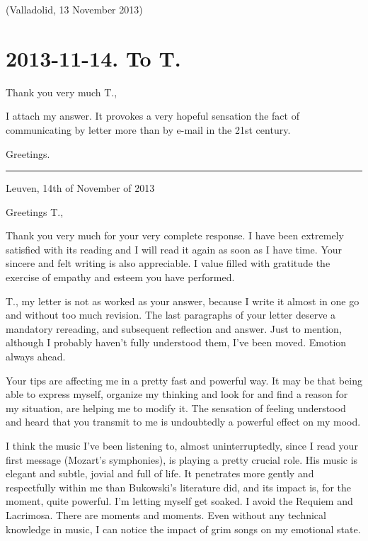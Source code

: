 \documentclass[]{book}
\begin{document}
(Valladolid, 13 November 2013)

\hypertarget{totomas20131114}{%
\section*{2013-11-14. To T.}\label{totomas20131114}}

Thank you very much T.,

I attach my answer. It provokes a very hopeful sensation the fact of communicating by letter more than by e-mail in the 21st century.

Greetings.

\begin{center}\rule{0.5\linewidth}{\linethickness}\end{center}

Leuven, 14th of November of 2013

Greetings T.,

Thank you very much for your very complete response. I have been extremely satisfied with its reading and I will read it again as soon as I have time. Your sincere and felt writing is also appreciable. I value filled with gratitude the exercise of empathy and esteem you have performed.

T., my letter is not as worked as your answer, because I write it almost in one go and without too much revision. The last paragraphs of your letter deserve a mandatory rereading, and subsequent reflection and answer. Just to mention, although I probably haven't fully understood them, I've been moved. Emotion always ahead.

Your tips are affecting me in a pretty fast and powerful way. It may be that being able to express myself, organize my thinking and look for and find a reason for my situation, are helping me to modify it. The sensation of feeling understood and heard that you transmit to me is undoubtedly a powerful effect on my mood.

I think the music I've been listening to, almost uninterruptedly, since I read your first message (Mozart's symphonies), is playing a pretty crucial role. His music is elegant and subtle, jovial and full of life. It penetrates more gently and respectfully within me than Bukowski's literature did, and its impact is, for the moment, quite powerful. I'm letting myself get soaked. I avoid the Requiem and Lacrimosa. There are moments and moments. Even without any technical knowledge in music, I can notice the impact of grim songs on my emotional state.
\end{document}
